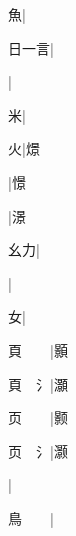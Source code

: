\begin{multicols}{2}
{{\cjk{}{\cnsym{}　}{\cnsym{}　}魚}|{}\par
{\cjk{}日一言}|{}\par
{}|{}\par
{\cjk{}{\cnsym{}　}{\cnsym{}　}米}|{}\par
{\cjk{}{\cnsym{}　}{\cnsym{}　}火}|{\cjk{}燝}\par
{}|{\cjk{}憬}\par
{}|{\cjk{}澋}\par
{\cjk{}{\cnsym{}　}幺力}|{}\par
{}|{}\par
{\cjk{}{\cnsym{}　}{\cnsym{}　}女}|{}\par
{\cjk{}頁{\cnsym{}　}{\cnsym{}　}}|{\cjk{}顥}\par
{\cjk{}頁{\cnsym{}　}{\cnxHanaA{}氵}}|{\cjk{}灝}\par
{\cjk{}页{\cnsym{}　}{\cnsym{}　}}|{\cjk{}颢}\par
{\cjk{}页{\cnsym{}　}{\cnxHanaA{}氵}}|{\cjk{}灏}\par
{}|{}\par
{\cjk{}鳥{\cnsym{}　}{\cnsym{}　}}|{}\par
}
\end{multicols}
